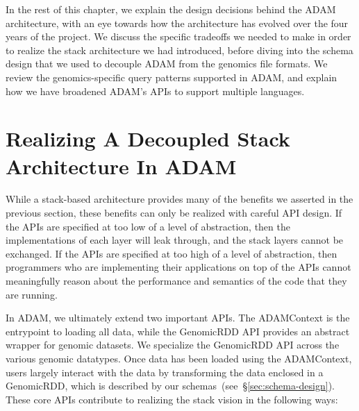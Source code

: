 \documentclass[phd]{ucbthesis}
\begin{document}
In the rest of this chapter, we explain the design decisions behind the
{ADAM} architecture, with an eye towards how the architecture has
evolved over the four years of the project. We discuss the specific tradeoffs
we needed to make in order to realize the stack architecture we had introduced,
before diving into the schema design that we used to decouple {ADAM} from
the genomics file formats. We review the genomics-specific query patterns
supported in {ADAM}, and explain how we have broadened {ADAM}'s
APIs to support multiple languages.

\section{Realizing A Decoupled Stack Architecture In {ADAM}}
\label{sec:realizing-stack-architecture}

While a stack-based architecture provides many of the benefits we asserted in
the previous section, these benefits can only be realized with careful API
design. If the APIs are specified at too low of a level of abstraction, then the
implementations of each layer will leak through, and the stack layers cannot be
exchanged. If the APIs are specified at too high of a level of abstraction, then
programmers who are implementing their applications on top of the APIs cannot
meaningfully reason about the performance and semantics of the code that they
are running.

In {ADAM}, we ultimately extend two important APIs. The
{ADAMContext} is the entrypoint to loading all data, while the
{GenomicRDD} API provides an abstract wrapper for genomic datasets. We
specialize the {GenomicRDD} API across the various genomic datatypes.
Once data has been loaded using the {ADAMContext}, users largely interact
with the data by transforming the data enclosed in a {GenomicRDD}, which
is described by our schemas~(see~\S\ref{sec:schema-design}). These core APIs
contribute to realizing the stack vision in the following ways:
\end{document}
